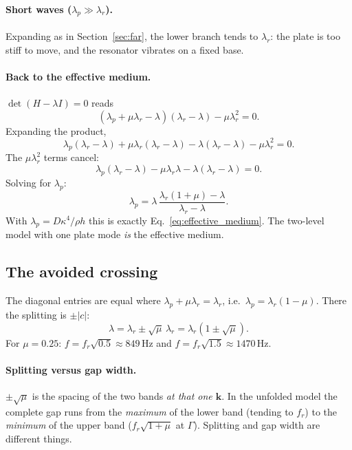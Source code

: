 \paragraph{Short waves ($\lambda_p \gg \lambda_r$).}
Expanding as in Section~\ref{sec:far}, the lower branch tends to $\lambda_r$:
the plate is too stiff to move, and the resonator vibrates on a fixed base.

\paragraph{Back to the effective medium.}
$\det(H - \lambda I) = 0$ reads
\begin{equation}
  (\lambda_p + \mu\lambda_r - \lambda)(\lambda_r - \lambda) - \mu\lambda_r^2 = 0 .
\end{equation}
Expanding the product,
\begin{equation}
  \lambda_p(\lambda_r - \lambda) + \mu\lambda_r(\lambda_r - \lambda) - \lambda(\lambda_r - \lambda) - \mu\lambda_r^2 = 0 .
\end{equation}
The $\mu\lambda_r^2$ terms cancel:
\begin{equation}
  \lambda_p(\lambda_r - \lambda) - \mu\lambda_r\lambda - \lambda(\lambda_r - \lambda) = 0 .
\end{equation}
Solving for $\lambda_p$:
\begin{equation}
  \lambda_p = \lambda\,\frac{\lambda_r(1+\mu) - \lambda}{\lambda_r - \lambda} .
\end{equation}
With $\lambda_p = D\kappa^4/\rho h$ this is exactly
Eq.~\eqref{eq:effective_medium}. The two-level model with one plate mode
\emph{is} the effective medium.

\subsection{The avoided crossing}
The diagonal entries are equal where $\lambda_p + \mu\lambda_r = \lambda_r$,
i.e.\ $\lambda_p = \lambda_r(1-\mu)$. There the splitting is $\pm|c|$:
\begin{equation}
  \lambda = \lambda_r \pm \sqrt{\mu}\,\lambda_r = \lambda_r(1 \pm \sqrt{\mu}) .
\end{equation}
For $\mu = 0.25$: $f = f_r\sqrt{0.5} \approx 849\,\mathrm{Hz}$ and
$f = f_r\sqrt{1.5} \approx 1470\,\mathrm{Hz}$.

\paragraph{Splitting versus gap width.}
$\pm\sqrt{\mu}$ is the spacing of the two bands \emph{at that one
$\mathbf{k}$}. In the unfolded model the complete gap runs from the
\emph{maximum} of the lower band (tending to $f_r$) to the \emph{minimum} of the
upper band ($f_r\sqrt{1+\mu}$ at $\Gamma$). Splitting and gap width are
different things.

